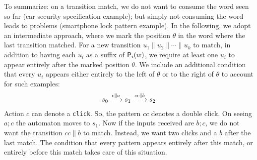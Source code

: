  To summarize: on a transition match, we do not want to consume the word seen so far (car security specification example); but simply not consuming the word leads to problems (smartphone lock pattern example). In the following, we adopt an intermediate approach, where we mark the position $\theta$ in the word where the last transition matched. For a new transition $u_1 \parallel u_2 \parallel \cdots \parallel u_k$ to match, in addition to having each $u_i$ as a suffix of $\mathsf{P}_{i}(w)$, we require at least one $u_i$ to appear entirely after the marked position $\theta$. We include an additional condition that every $u_i$ appears either entirely to the left of $\theta$ or to the right of $\theta$ to account for such examples: 
 \begin{align*}
  s_0 \xrightarrow{c \parallel a} s_1 \xrightarrow{cc \parallel b}s_2
 \end{align*}
 Action $c$ can denote a \texttt{click}. So, the pattern $cc$ denotes a double click. On seeing $a; c$ the automaton moves to $s_1$. Now if the inputs received are $b; c$, we do not want the transition $cc \parallel b$ to match. Instead, we want two clicks and a $b$ after the last match. The condition that every pattern appears entirely after this match, or entirely before this match takes care of this situation.%
 



